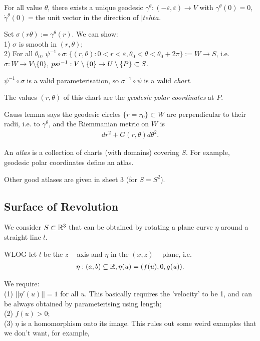 \documentclass[a4paper]{article}
\begin{document}
For all value $\theta$, there exists a unique geodesic $\gamma^\theta:(-\varepsilon,\varepsilon) \to V$ with $\gamma^\theta(0) =0$, $\dot{\gamma}^\theta(0) = $the unit vector in the direction of $|tehta$.

Set $\sigma(r\theta) := \gamma^\theta(r)$. We can show:\\
1) $\sigma$ is smooth in $(r,\theta)$;\\
2) For all $\theta_0$, $\psi^{-1} \circ \sigma: \{(r,\theta): 0 < r < \varepsilon, \theta_0 < \theta < \theta_0+2\pi\} := W \to S$, i.e. $\sigma: W \to V \setminus\{0\}$, $\\psi^{-1}: V \setminus\{0\} \to U \setminus\{P\} \subset S$.

$\psi^{-1} \circ \sigma$ is a valid parameterisation, so $\sigma^{-1} \circ \psi$ is a valid \emph{chart}.

The values $(r,\theta)$ of this chart are the \emph{geodesic polar coordinates} at $P$.

Gauss lemma says the geodesic circles $\{r = r_0\} \subset W$ are perpendicular to their radii, i.e. to $\gamma^\theta$, and the Riemmanian metric on $W$ is
\begin{equation*}
\begin{aligned}
dr^2 + G(r,\theta)d\theta^2.
\end{aligned}
\end{equation*}

An \emph{atlas} is a collection of charts (with domains) covering $S$. For example, geodesic polar coordinates define an atlas.

Other good atlases are given in sheet 3 (for $S = S^2$).

\subsection{Surface of Revolution}
We consider $S \subset \mathbb{R}^3$ that can be obtained by rotating a plane curve $\eta$ around a straight line $l$.

WLOG let $l$ be the $z-$axis and $\eta$ in the $(x,z)-$plane, i.e.
\begin{equation*}
\begin{aligned}
\eta:(a,b) \subseteq \mathbb{R}, \eta(u) = (f(u),0,g(u)).
\end{aligned}
\end{equation*}

We require:\\
(1) $||\eta'(u)|| = 1$ for all $u$. This basically requires the 'velocity' to be 1, and can be always obtained by parameterising using length;\\
(2) $f(u)>0$;\\
(3) $\eta$ is a homomorphism onto its image. This rules out some weird examples that we don't want, for example,
\end{document}
